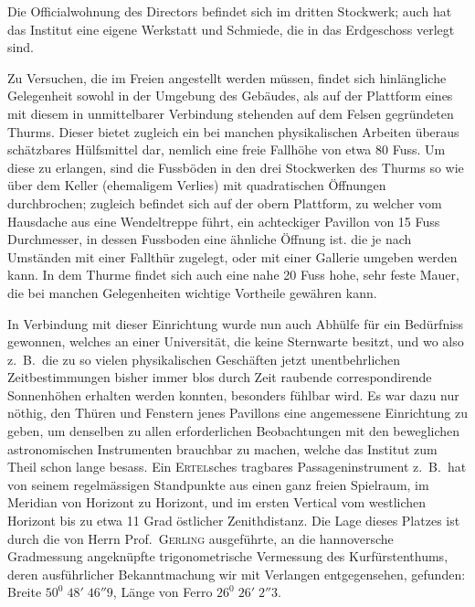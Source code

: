 Die Officialwohnung des Directors befindet sich im dritten Stockwerk; auch hat das Institut eine eigene Werkstatt und Schmiede, die in das Erdgeschoss verlegt sind.

Zu Versuchen, die im Freien angestellt werden müssen, findet sich hinlängliche Gelegenheit sowohl in der Umgebung des Gebäudes, als auf der Plattform eines mit diesem in unmittelbarer Verbindung stehenden auf dem Felsen gegründeten Thurms. Dieser bietet zugleich ein bei manchen physikalischen Arbeiten überaus schätzbares Hülfsmittel dar, nemlich eine freie Fallhöhe von etwa 80 Fuss. Um diese zu erlangen, sind die Fussböden in den drei Stockwerken des Thurms so wie über dem Keller (ehemaligem Verlies) mit quadratischen Öffnungen durchbrochen; zugleich befindet sich auf der obern Plattform, zu welcher vom Hausdache aus eine Wendeltreppe führt, ein achteckiger Pavillon von 15 Fuss Durchmesser, in dessen Fussboden eine ähnliche Öffnung ist. die je nach Umständen mit einer Fallthür zugelegt, oder mit einer Gallerie umgeben werden kann. In dem Thurme findet sich auch eine nahe 20 Fuss hohe, sehr feste Mauer, die bei manchen Gelegenheiten wichtige Vortheile gewähren kann.

In Verbindung mit dieser Einrichtung wurde nun auch Abhülfe für ein Bedürfniss gewonnen, welches an einer Universität, die keine Sternwarte besitzt, und wo also z.\ B.\ die zu so vielen physikalischen Geschäften jetzt unentbehrlichen Zeitbestimmungen bisher immer blos durch Zeit raubende correspondirende Sonnenhöhen erhalten werden konnten, besonders fühlbar wird. Es war dazu nur nöthig, den Thüren und Fenstern jenes Pavillons eine angemessene Einrichtung zu geben, um denselben zu allen erforderlichen Beobachtungen mit den beweglichen astronomischen Instrumenten brauchbar zu machen, welche das Institut zum Theil schon lange besass. Ein \textsc{Ertel}sches tragbares Passageninstrument z.\ B.\ hat von seinem regelmässigen Standpunkte aus einen ganz freien Spielraum, im Meridian von Horizont zu Horizont, und im ersten Vertical vom westlichen Horizont bis zu etwa 11 Grad östlicher Zenithdistanz. Die Lage dieses Platzes
ist durch die von Herrn Prof.\ \textsc{Gerling} ausgeführte, an die hannoversche Gradmessung angeknüpfte trigonometrische Vermessung des Kurfürstenthums, deren ausführlicher Bekanntmachung wir mit Verlangen entgegensehen, gefunden: Breite $50^0\;48'\;46''9$, Länge von Ferro $26^0\;26'\;2''3$.

